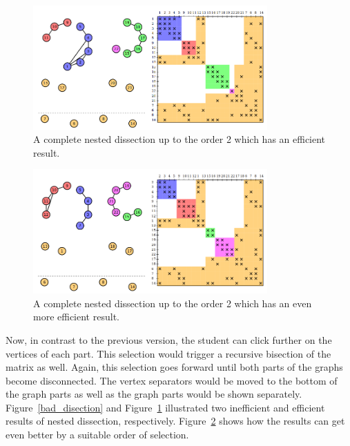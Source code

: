 \documentclass[11pt, twoside,a4paper]{book}
\begin{document}
\begin{figure}
\centering
\includegraphics[width=0.8\textwidth]{good_disection}
\caption{A complete nested dissection up to the order 2 which has an
efficient result.}
\label{good_disection}
\end{figure}

\begin{figure}
\centering
\includegraphics[width=0.8\textwidth]{good_disection2}
\caption{A complete nested dissection up to the order 2 which has an
even more efficient result.}
\label{good_disection2}
\end{figure}

Now, in contrast to the previous version, the student can click further
on the vertices of each part. This selection would trigger a recursive
bisection of the matrix as well. Again, this selection goes forward until
both parts of the graphs become disconnected. The vertex separators
would be moved to the bottom of the graph parts as well as the graph parts
would be shown separately. Figure~\ref{bad_disection} and Figure~\ref{good_disection} illustrated two inefficient and efficient results of nested dissection,
respectively. Figure~\ref{good_disection2} shows how the results can
get even better by a suitable order of selection.
\end{document}

